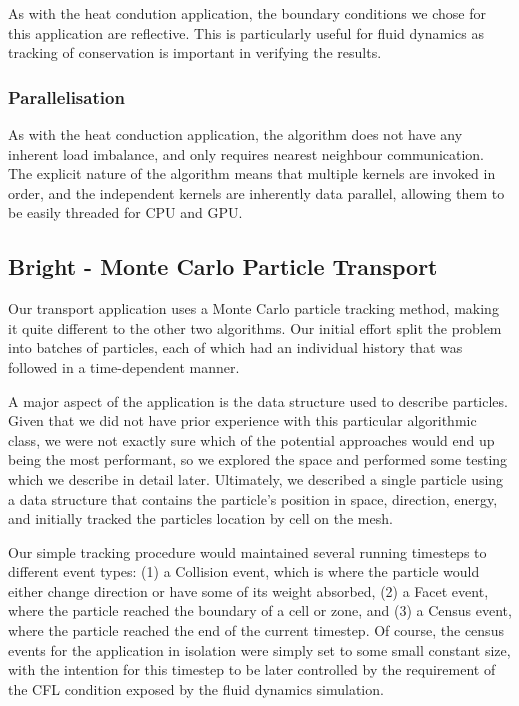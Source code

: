 \documentclass[runningheads,a4paper]{llncs}
\begin{document}
As with the heat condution application, the boundary conditions we chose for this application are reflective. This is particularly useful for fluid dynamics as tracking of conservation is important in verifying the results.

\subsubsection{Parallelisation}

As with the heat conduction application, the algorithm does not have any inherent load imbalance, and only requires nearest neighbour communication. The explicit nature of the algorithm means that multiple kernels are invoked in order, and the independent kernels are inherently data parallel, allowing them to be easily threaded for CPU and GPU.

\subsection{Bright - Monte Carlo Particle Transport}

Our transport application uses a Monte Carlo particle tracking method, making it quite different to the other two algorithms. Our initial effort split the problem into batches of particles, each of which had an individual history that was followed in a time-dependent manner. 

A major aspect of the application is the data structure used to describe particles. Given that we did not have prior experience with this particular algorithmic class, we were not exactly sure which of the potential approaches would end up being the most performant, so we explored the space and performed some testing which we describe in detail later. Ultimately, we described a single particle using a data structure that contains the particle's position in space, direction, energy, and initially tracked the particles location by cell on the mesh.

Our simple tracking procedure would maintained several running timesteps to different event types: (1) a Collision event, which is where the particle would either change direction or have some of its weight absorbed, (2) a Facet event, where the particle reached the boundary of a cell or zone, and (3) a Census event, where the particle reached the end of the current timestep. Of course, the census events for the application in isolation were simply set to some small constant size, with the intention for this timestep to be later controlled by the requirement of the CFL condition exposed by the fluid dynamics simulation.
\end{document}
